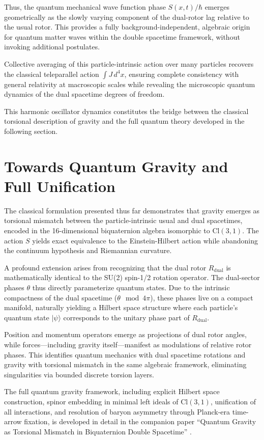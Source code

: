 \documentclass[dvipdfmx,a4paper]{article}
\begin{document}
Thus, the quantum mechanical wave function phase $S(x,t)/\hbar$ emerges geometrically as the slowly varying component of the dual-rotor lag relative to the usual rotor. This provides a fully background-independent, algebraic origin for quantum matter waves within the double spacetime framework, without invoking additional postulates.

Collective averaging of this particle-intrinsic action over many particles recovers the classical teleparallel action $\int J \, d^4x$, ensuring complete consistency with general relativity at macroscopic scales while revealing the microscopic quantum dynamics of the dual spacetime degrees of freedom.

This harmonic oscillator dynamics constitutes the bridge between the classical torsional description of gravity and the full quantum theory developed in the following section.

\section{Towards Quantum Gravity and Full Unification}
\label{sec:quantumgravity}

The classical formulation presented thus far demonstrates that gravity emerges as torsional mismatch between the particle-intrinsic usual and dual spacetimes, encoded in the 16-dimensional biquaternion algebra isomorphic to $\mathrm{Cl}(3,1)$. The action $S$ yields exact equivalence to the Einstein-Hilbert action while abandoning the continuum hypothesis and Riemannian curvature.

A profound extension arises from recognizing that the dual rotor $R_\text{dual}$ is mathematically identical to the SU(2) spin-1/2 rotation operator. The dual-sector phases $\theta$ thus directly parameterize quantum states. Due to the intrinsic compactness of the dual spacetime ($\theta \mod 4\pi$), these phases live on a compact manifold, naturally yielding a Hilbert space structure where each particle's quantum state $|\psi\rangle$ corresponds to the unitary phase part of $R_\text{dual}$.

Position and momentum operators emerge as projections of dual rotor angles, while forces—including gravity itself—manifest as modulations of relative rotor phases. This identifies quantum mechanics with dual spacetime rotations and gravity with torsional mismatch in the same algebraic framework, eliminating singularities via bounded discrete torsion layers.

The full quantum gravity framework, including explicit Hilbert space construction, spinor embedding in minimal left ideals of $\mathrm{Cl}(3,1)$, unification of all interactions, and resolution of baryon asymmetry through Planck-era time-arrow fixation, is developed in detail in the companion paper ``Quantum Gravity as Torsional Mismatch in Biquaternion Double Spacetime'' \cite{dst-quantum-gravity}.
\end{document}
